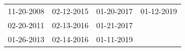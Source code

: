 \begin{supertabular}{llll}
 11-20-2008 &  02-12-2015 &  01-20-2017 &  01-12-2019 \\
 02-20-2011 &  02-13-2016 &  01-21-2017 &             \\
 01-26-2013 &  02-14-2016 &  01-11-2019 &             \\
\end{supertabular}
